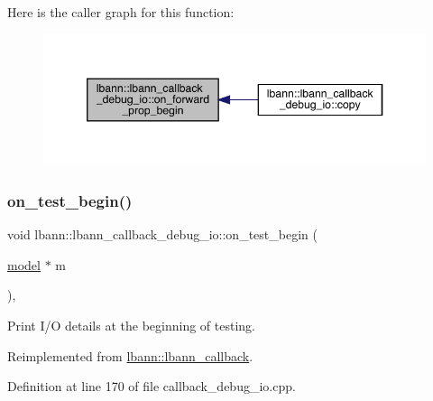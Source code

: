 Here is the caller graph for this function\+:\nopagebreak
\begin{figure}[H]
\begin{center}
\leavevmode
\includegraphics[width=346pt]{classlbann_1_1lbann__callback__debug__io_aa31ee265d40edff982ebf38054394927_icgraph}
\end{center}
\end{figure}
\mbox{\label{classlbann_1_1lbann__callback__debug__io_a469dfa4eece0a707a2d56f4c67aea9b7}} 
\subsubsection{\texorpdfstring{on\+\_\+test\+\_\+begin()}{on\_test\_begin()}}
{\footnotesize\ttfamily void lbann\+::lbann\+\_\+callback\+\_\+debug\+\_\+io\+::on\+\_\+test\+\_\+begin (\begin{DoxyParamCaption}\item[{\hyperlink{classlbann_1_1model}{model} $\ast$}]{m }\end{DoxyParamCaption})\hspace{0.3cm}{\ttfamily [override]}, {\ttfamily [virtual]}}

Print I/O details at the beginning of testing. 

Reimplemented from \hyperlink{classlbann_1_1lbann__callback_a716bff45bdc5a88eed09c2231f5bc93a}{lbann\+::lbann\+\_\+callback}.



Definition at line 170 of file callback\+\_\+debug\+\_\+io.\+cpp.


